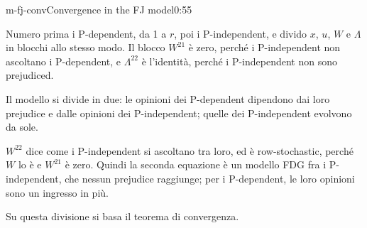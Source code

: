 \begin{slide}{m-fj-conv}{Convergence in the FJ model}{0:55 {\color{red}}}
\begin{discorso}
    \item {\color{blue}Numero prima i P-dependent, da 1 a $r$, poi i P-independent, e divido $x$, $u$, $W$ e $\Lambda$ in blocchi allo stesso modo. Il blocco $W^{21}$ è zero, perché i P-independent non ascoltano i P-dependent, e $\Lambda^{22}$ è l'identità, perché i P-independent non sono prejudiced.}
    \item {\color{blue}Il modello si divide in due: le opinioni dei P-dependent dipendono dai loro prejudice e dalle opinioni dei P-independent; quelle dei P-independent evolvono da sole.}
    \item {\color{blue}$W^{22}$ dice come i P-independent si ascoltano tra loro, ed è row-stochastic, perché $W$ lo è e $W^{21}$ è zero. Quindi la seconda equazione è un modello FDG fra i P-independent, che nessun prejudice raggiunge; per i P-dependent, le loro opinioni sono un ingresso in più.}
    \item {\color{blue}Su questa divisione si basa il teorema di convergenza.}
    \item {\color{red}        }
    \item {\color{red}     }
  \end{discorso}
\end{slide}

